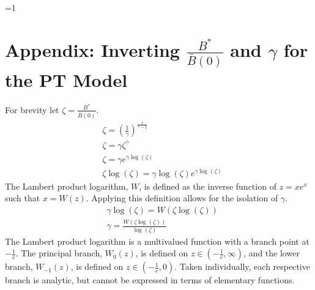\documentclass[12pt]{article}
\newcounter{alphasect}
\def\alphainsection{0}
\let\oldsection=\section
\def\section{%
  \ifnum\alphainsection=1%
    \addtocounter{alphasect}{1}
  \fi%
\oldsection}%
\begin{document}
%
%




%
\clearpage

%
\section{Appendix\label{lambApp}: Inverting $\frac{B^*}{\bar B(0)}$ and $\gamma$ for the PT Model}
For brevity let $\zeta=\frac{B^*}{\bar B(0)}$.
\begin{align*}
&\zeta=\left(\frac{1}{\gamma}\right)^{\frac{1}{\gamma-1}}\\
&\zeta=\gamma\zeta^{\gamma}\\
&\zeta=\gamma e^{\gamma\log(\zeta)}\\
&\zeta\log(\zeta)=\gamma\log(\zeta) e^{\gamma\log(\zeta)}
\end{align*}
The Lambert product logarithm, $W$, is defined as the inverse function of $z=xe^x$ such that $x=W(z)$. 
Applying this definition allows for the isolation of $\gamma$.
\begin{align}
&\gamma\log(\zeta)=W\left(\zeta\log(\zeta)\right) \nonumber\\
&\gamma=\frac{W\left(\zeta\log(\zeta)\right)}{\log(\zeta)} \label{gammaOfZeta}
\end{align}
The Lambert product logarithm is a multivalued function with a branch point at 
$-\frac{1}{e}$. The principal branch, $W_0(z)$, is defined on $z\in\left(-\frac{1}{e}, \infty\right)$, 
and the lower branch, $W_{-1}(z)$, is defined on $z\in\left(-\frac{1}{e}, 0\right)$. Taken 
individually, each respective branch is analytic, but cannot be expressed in terms 
of elementary functions.
\end{document}
